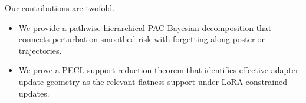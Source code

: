 \documentclass{article}
\begin{document}


Our contributions are twofold.
\begin{itemize}
    \item We provide a pathwise hierarchical PAC-Bayesian decomposition that connects perturbation-smoothed risk with forgetting along posterior trajectories.
    \item We prove a PECL support-reduction theorem that identifies effective adapter-update geometry as the relevant flatness support under LoRA-constrained updates.
    
\end{itemize}
\end{document}
